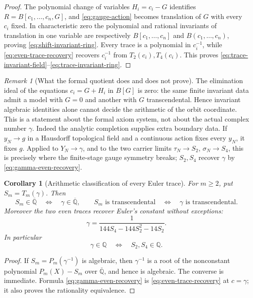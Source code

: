 \documentclass[11pt]{article}
\newtheorem{corollary}[theorem]{Corollary}
\theoremstyle{definition}
\theoremstyle{remark}
\newtheorem{remark}[theorem]{Remark}
\newcommand{\Q}{\mathbb Q}
\newcommand{\Qbar}{\overline{\mathbb Q}}
\begin{document}
\begin{proof}
The polynomial change of variables \(H_i=c_i-G\) identifies
\(R=B[c_1,\ldots,c_n,G]\), and \eqref{eq:gauge-action} becomes translation
of \(G\) with every \(c_i\) fixed.  In characteristic zero the polynomial
and rational invariants of translation in one variable are respectively
\(B[c_1,\ldots,c_n]\) and \(B(c_1,\ldots,c_n)\), proving
\eqref{eq:shift-invariant-ring}.  Every trace is a polynomial in
\(c_i^{-1}\), while \eqref{eq:even-trace-recovery} recovers \(c_i^{-1}\)
from \(T_2(c_i),T_4(c_i)\).  This proves
\eqref{eq:trace-invariant-field}--\eqref{eq:trace-invariant-ring}.
\end{proof}

\begin{remark}[What the formal quotient does and does not prove]
The elimination ideal of the equations \(c_i=G+H_i\) in \(B[G]\) is zero:
the same finite invariant data admit a model with \(G=0\) and another with
\(G\) transcendental.  Hence invariant algebraic identities alone cannot
decide the arithmetic of the orbit coordinate.  This is a statement about
the formal axiom system, not about the actual complex number \(\gamma\).
Indeed the analytic completion supplies extra boundary data.  If
\(y_N\to g\) in a Hausdorff topological field and a continuous action fixes
every \(y_N\), it fixes \(g\).  Applied to \(Y_N\to\gamma\), and to the two
carrier limits \(\tau_N\to S_2\), \(\sigma_N\to S_4\), this is precisely
where the finite-stage gauge symmetry breaks; \(S_2,S_4\) recover
\(\gamma\) by \eqref{eq:gamma-even-recovery}.
\end{remark}

\begin{corollary}[Arithmetic classification of every Euler trace]
\label{cor:Euler-trace-arithmetic}
For \(m\ge2\), put \(S_m=T_m(\gamma)\).  Then
\[
 S_m\in\Qbar\quad\Longleftrightarrow\quad\gamma\in\Qbar,
 \qquad
 S_m\text{ is transcendental}
 \quad\Longleftrightarrow\quad\gamma\text{ is transcendental}.
\]
Moreover the two even traces recover Euler's constant without exceptions:
\begin{equation}\label{eq:gamma-even-recovery}
 \boxed{\displaystyle
 \gamma=\frac1{144S_4-144S_2^2-14S_2}.}
\end{equation}
In particular
\[
 \gamma\in\Q\quad\Longleftrightarrow\quad S_2,S_4\in\Q.
\]
\end{corollary}

\begin{proof}
If \(S_m=P_m(\gamma^{-1})\) is algebraic, then \(\gamma^{-1}\) is a root
of the nonconstant polynomial \(P_m(X)-S_m\) over \(\Qbar\), and hence is
algebraic.  The converse is immediate.  Formula
\eqref{eq:gamma-even-recovery} is \eqref{eq:even-trace-recovery} at
\(c=\gamma\); it also proves the rationality equivalence.
\end{proof}
\end{document}
